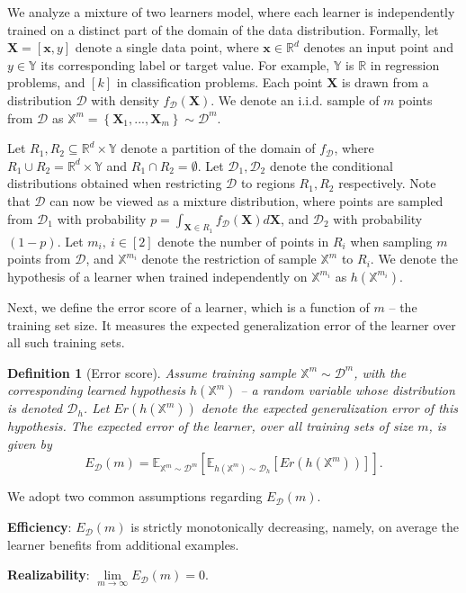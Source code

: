 \documentclass{article}
\newcommand{\E}{\mathbb{E}}
\newcommand{\R}{\mathbb{R}}
\newcommand{\Y}{\mathbb{Y}}
\newcommand{\iX}{\mathbb{X}}
\newcommand{\bx}{\bm{x}}
\newcommand{\bX}{{\mathbf X}}
\newcommand{\Dd}{\mathcal{D}}
\newcommand{\pR}{1}\newcommand{\rR}{2}\newcommand{\prR}{i}
\newcommand{\hdD}{{h}}\newcommand{\hD}{{h}}\newcommand{\qhard}{\alpha}
\newtheorem{defn}{Definition}
\begin{document}
We analyze a mixture of two learners model, where each learner is independently trained on a distinct part of the domain of the data distribution. Formally, let $\bX=[\bx,y]$ denote a single data point, where $\bx\in\R^d$ denotes an input point and $y\in\Y$ its corresponding label or target value. For example, $\Y$ is $\R$ in regression problems, and $[k]$ in classification problems. Each point $\bX$ is drawn from a distribution $\Dd$ with density $f_\Dd(\bX)$. We denote an i.i.d. sample of $m$ points from $\Dd$ as $\iX^m=\left\{\bX_1,...,\bX_m\right\}\sim\Dd^m$.

Let $R_\pR,R_\rR\subseteq\mathbb{R}^{d}\times\Y$ denote a partition of the domain of $f_\Dd$, where $R_\pR\cup R_\rR=\mathbb{R}^{d}\times\Y$ and $R_\pR\cap R_\rR=\emptyset$. 
Let $\Dd_\pR, \Dd_\rR$ denote the conditional distributions obtained when restricting $\Dd$ to regions $R_\pR, R_\rR$ respectively. Note that $\Dd$ can now be viewed as a mixture distribution, where points are sampled from $\Dd_\pR$ with probability  $p=\int_{\bX\in R_\pR}f_\Dd(\bX)d\bX$, and $\Dd_\rR$ with probability $(1-p)$.
Let $m_\prR,~\prR\in[2]$ denote the number of points in $R_\prR$ when sampling $m$ points from $\Dd$, and $\iX^{m_\prR}$ denote  the restriction of sample $\iX^m$ to $R_\prR$. We denote the hypothesis of a learner when trained independently on $\iX^{m_\prR}$ as $\hdD(\iX^{m_\prR})$.

Next, we define the error score of a learner, which is a function of $m$ -- the training set size. It measures the expected generalization error of the learner over all such training sets.
\begin{defn}[Error score] 
Assume training sample $\iX^m\sim\Dd^m$, with the corresponding learned hypothesis $\hdD(\iX^{m})$ -- a random variable whose distribution is denoted $\Dd_h$. Let $Er\left(h\left(\iX^{m}\right)\right)$ denote the expected generalization error of this hypothesis. The expected error of the learner, over all training sets of size $m$, is given by
\begin{equation*}
E_{\Dd}(m) = \E_{\iX^{m}\sim\Dd^m}\left[\E_{\hD(\iX^{m})\sim\Dd_h}\left[Er\left(h\left(\iX^{m}\right)\right)\right]\right].
\end{equation*}
\label{def:expected-error}
\vspace{-.5cm}
\end{defn} 

We adopt two common assumptions regarding $E_{\Dd}(m)$. \begin{inparaenum}[(i)] \item  \textbf{Efficiency}: $E_{\Dd}(m)$ is strictly monotonically decreasing, namely, on average the learner benefits from additional examples. \item \textbf{Realizability}: $\lim\limits_{m \rightarrow\infty}E_{\Dd}(m) =0$. \end{inparaenum}
\end{document}
